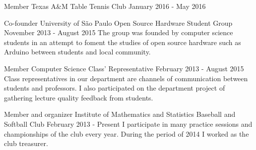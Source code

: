 \documentclass[11pt, a4paper]{awesome-cv-res}
\begin{document}
\begin{cventries}
\cventry
    {Member\vspace{-3em}}
    {\vspace{-3em}Texas A\&M Table Tennis Club}
{}
{January 2016 - May 2016}
{}

\cventry
{Co-founder}
{University of São Paulo Open Source Hardware Student Group}
{}
{November 2013 - August 2015}
{The group was founded by computer science students in an attempt to 
foment the studies of open source hardware such as Arduino between 
students and local community. }

\cventry
{Member}
{Computer Science Class' Representative}
{}
{February 2013 - August 2015}
{Class representatives in our department are channels of communication
    between students and professors. I also participated on the 
    department project of gathering lecture quality feedback from 
    students.}

\cventry
{Member and organizer}
{Institute of Mathematics and Statistics Baseball and Softball Club}
{}
{February 2013 - Present}
{I participate in many practice sessions and championships of the club 
    every year. During the period of 2014 I worked as the club 
    treasurer.}

\end{cventries}
\end{document}
